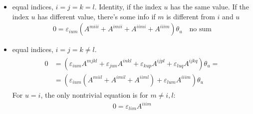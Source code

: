 \documentclass[letterpaper,10pt,english]{jupyterBook}
\begin{document}
\begin{itemize}
\item {} 
 equal indices, \(i = j = k = l\). Identity, if the index \(u\) has the same value. If the index \(u\) has different value, there’s some info if \(m\) is different from \(i\) and \(u\)
\begin{equation*}
\begin{split}0 = \varepsilon_{ium} \left( A^{miii} + A^{imii} + A^{iimi} + A^{iiim} \right) \theta_u \quad \text{no sum}\end{split}
\end{equation*}
\item {} 
 equal indices, \(i = j = k \ne l\).
\begin{equation*}
\begin{split}\begin{aligned}
    0 & = \left(
      \varepsilon_{ium} A^{mjkl} + \varepsilon_{jun} A^{inkl} + \varepsilon_{kup} A^{ijpl} + \varepsilon_{luq} A^{ijkq}
      \right) \theta_u = \\
      & = \left( \varepsilon_{ium} \left( A^{miil} + A^{imil} + A^{iiml} \right) + \varepsilon_{lum} A^{iiim} \right) \theta_u
   \end{aligned}\end{split}
\end{equation*}
\sphinxAtStartPar
For \(u = i\), the only non\sphinxhyphen{}trivial equation is for \(m \ne i, l\):
\begin{equation*}
\begin{split}0 = \varepsilon_{lim} A^{iiim}\end{split}
\end{equation*}
\sphinxAtStartPar
{}

\end{itemize}
\end{document}

